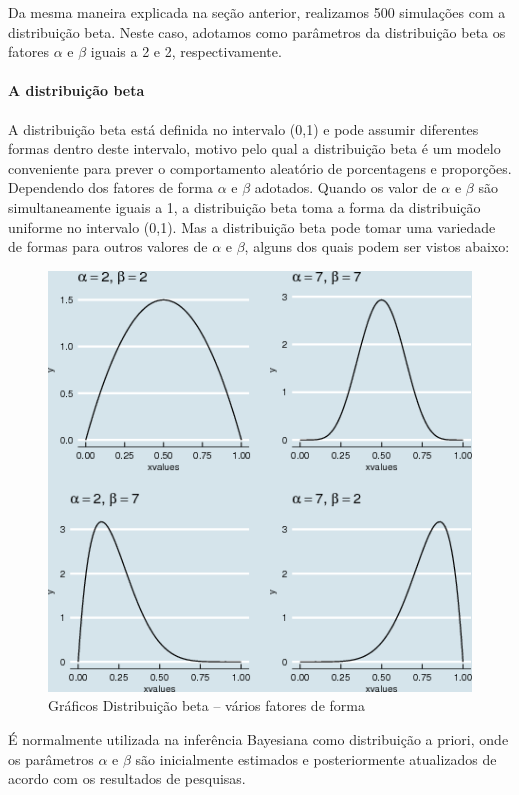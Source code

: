 \documentclass[a4paper]{article}
\let\oldparagraph\paragraph
\renewcommand{\paragraph}[1]{\oldparagraph{#1}\mbox{}}
\begin{document}
Da mesma maneira explicada na seção anterior, realizamos 500 simulações
com a distribuição beta. Neste caso, adotamos como parâmetros da
distribuição beta os fatores \(\alpha\) e \(\beta\) iguais a 2 e 2,
respectivamente.

\paragraph{A distribuição beta}\label{a-distribuicao-beta}

A distribuição beta está definida no intervalo (0,1) e pode assumir
diferentes formas dentro deste intervalo, motivo pelo qual a
distribuição beta é um modelo conveniente para prever o comportamento
aleatório de porcentagens e proporções. Dependendo dos fatores de forma
\(\alpha\) e \(\beta\) adotados. Quando os valor de \(\alpha\) e
\(\beta\) são simultaneamente iguais a 1, a distribuição beta toma a
forma da distribuição uniforme no intervalo (0,1). Mas a distribuição
beta pode tomar uma variedade de formas para outros valores de
\(\alpha\) e \(\beta\), alguns dos quais podem ser vistos abaixo:

\begin{figure}[H]

{\centering \includegraphics[width=0.7\linewidth]{images/variasbeta-1} 

}

\caption{Gráficos Distribuição beta -- vários fatores de forma}\label{fig:variasbeta}
\end{figure}

É normalmente utilizada na inferência Bayesiana como distribuição a
priori, onde os parâmetros \(\alpha\) e \(\beta\) são inicialmente
estimados e posteriormente atualizados de acordo com os resultados de
pesquisas.
\end{document}
